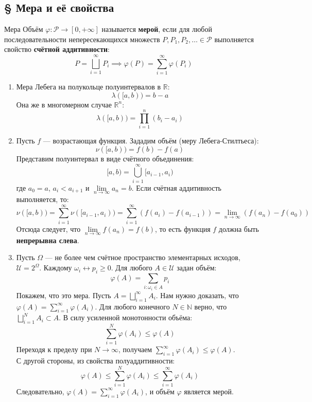 \documentclass[12pt,a4paper]{article}
\begin{document}
\subsection{§ Мера и её свойства}

\begin{Definition}{Мера}{}
Объём $\varphi: \mathcal{P} \to [0, +\infty]$ называется \textbf{мерой}, если для любой последовательности непересекающихся множеств $P, P_1, P_2, \dots \in \mathcal{P}$ выполняется свойство \textbf{счётной аддитивности}:
$$ P = \bigsqcup\limits_{i=1}^{\infty} P_i \implies \varphi(P) = \sum\limits_{i=1}^{\infty} \varphi(P_i) $$
\end{Definition}

\begin{Example}
\begin{enumerate}
    \item Мера Лебега на полукольце полуинтервалов в $\mathbb{R}$: 
    $$ \lambda([a, b)) = b - a $$
    Она же в многомерном случае $\mathbb{R}^n$: 
    $$ \lambda([a, b)) = \prod\limits_{i=1}^n (b_i - a_i) $$
    
    \item Пусть $f$ — возрастающая функция. Зададим объём (меру Лебега-Стилтьеса):
    $$ \nu([a, b)) = f(b) - f(a) $$
    Представим полуинтервал в виде счётного объединения:
    $$ [a, b) = \bigcup\limits_{i=1}^{\infty} [a_{i-1}, a_i) $$
    где $a_0 = a$, $a_i < a_{i+1}$ и $\lim\limits_{n \to \infty} a_n = b$. 
    Если счётная аддитивность выполняется, то:
    $$ \nu([a, b)) = \sum\limits_{i=1}^{\infty} \nu([a_{i-1}, a_i)) = \sum\limits_{i=1}^{\infty} \left( f(a_i) - f(a_{i-1}) \right) = \lim\limits_{n \to \infty} (f(a_n) - f(a_0)) $$
    Отсюда следует, что $\lim\limits_{n \to \infty} f(a_n) = f(b)$, то есть функция $f$ должна быть \textbf{непрерывна слева}.
    
    \item Пусть $\Omega$ — не более чем счётное пространство элементарных исходов, $\mathcal{U} = 2^\Omega$. Каждому $\omega_i \leftrightarrow p_i \ge 0$.
    Для любого $A \in \mathcal{U}$ задан объём:
    $$ \varphi(A) = \sum\limits_{i: \omega_i \in A} p_i $$
    Покажем, что это мера. Пусть $A = \bigsqcup\limits_{i=1}^{\infty} A_i$. Нам нужно доказать, что $\varphi(A) = \sum\limits_{i=1}^{\infty} \varphi(A_i)$.
    Для любого конечного $N \in \mathbb{N}$ верно, что $\bigsqcup\limits_{i=1}^N A_i \subset A$. В силу усиленной монотонности объёма:
    $$ \sum\limits_{i=1}^N \varphi(A_i) \le \varphi(A) $$
    Переходя к пределу при $N \to \infty$, получаем $\sum\limits_{i=1}^{\infty} \varphi(A_i) \le \varphi(A)$. \\
    С другой стороны, из свойства полуаддитивности: 
    $$ \varphi(A) \le \sum\limits_{i=1}^N \varphi(A_i) \le \sum\limits_{i=1}^{\infty} \varphi(A_i) $$
    Следовательно, $\varphi(A) = \sum\limits_{i=1}^{\infty} \varphi(A_i)$, и объём $\varphi$ является мерой.
\end{enumerate}
\end{Example}
\end{document}
